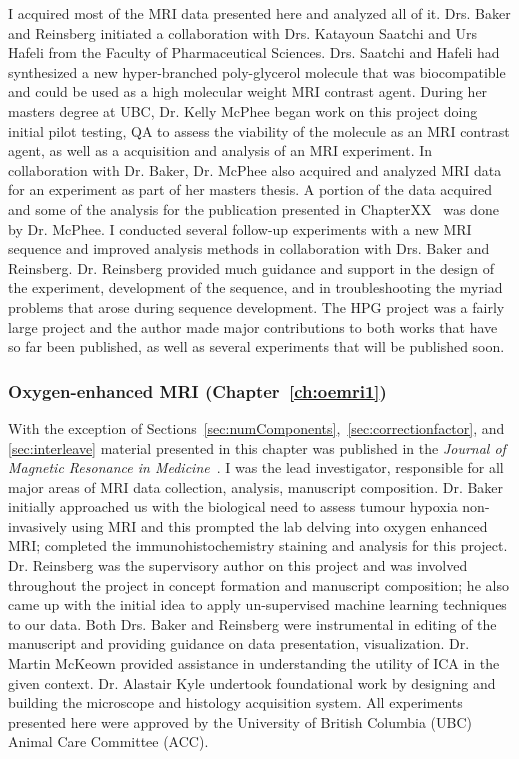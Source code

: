 I acquired most of the MRI data presented here and analyzed all of it.
Drs. Baker and Reinsberg initiated a collaboration with Drs. Katayoun Saatchi and Urs Hafeli from the Faculty of Pharmaceutical Sciences.
Drs. Saatchi and Hafeli had synthesized a new hyper-branched poly-glycerol molecule that was biocompatible and could be used as a high molecular weight MRI contrast agent.
During her masters degree at UBC, Dr. Kelly McPhee began work on this project doing initial pilot testing, QA to assess the viability of the molecule as an MRI contrast agent, as well as a acquisition and analysis of an MRI experiment.
In collaboration with Dr. Baker, Dr. McPhee also acquired and analyzed MRI data for an experiment as part of her masters thesis. 
A portion of the data acquired and some of the analysis for the publication presented in ChapterXX~ was done by Dr. McPhee.
I conducted several follow-up experiments with a new MRI sequence and improved analysis methods in collaboration with Drs. Baker and Reinsberg. 
Dr.  Reinsberg provided much guidance and support in the design of the experiment, development of the sequence, and in troubleshooting the myriad problems that arose during sequence development.
The HPG project was a fairly large project and the author made major contributions to both works that have so far been published, as well as several experiments that will be published soon.

\subsubsection{Oxygen-enhanced MRI (Chapter~\ref{ch:oemri1})}

With the exception of Sections~\ref{sec:numComponents},~\ref{sec:correctionfactor}, and \ref{sec:interleave} material presented in this chapter was published in the \textit{Journal of Magnetic Resonance in Medicine}~\cite{Moosvi:2018ca}. 
I was the lead investigator, responsible for all major areas of MRI data collection, analysis, manuscript composition. 
Dr. Baker initially approached us with the biological need to assess tumour hypoxia non-invasively using MRI and this prompted the lab delving into oxygen enhanced MRI; completed the immunohistochemistry staining and analysis for this project.
Dr. Reinsberg was the supervisory author on this project and was involved throughout the project in concept formation and manuscript composition; he also came up with the initial idea to apply un-supervised machine learning techniques to our data. 
Both Drs. Baker and Reinsberg were instrumental in editing of the manuscript and providing guidance on data presentation, visualization.
Dr. Martin McKeown provided assistance in understanding the utility of \ac{ICA} in the given context. 
Dr. Alastair Kyle undertook foundational work by designing and building the microscope and histology acquisition system. 
All experiments presented here were approved by the University of British Columbia (UBC) Animal Care Committee (ACC).

